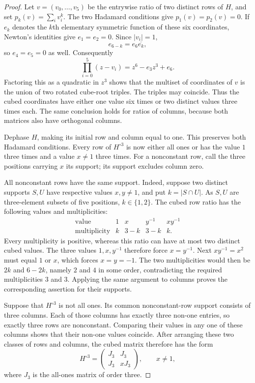 \begin{proof}
Let $v=(v_0,\ldots,v_5)$ be the entrywise ratio of two distinct rows of
$H$, and set $p_k(v)=\sum_i v_i^k$. The two Hadamard conditions give
$p_1(v)=p_2(v)=0$. If $e_k$ denotes the $k$th elementary symmetric
function of these six coordinates, Newton's identities give
$e_1=e_2=0$. Since $|v_i|=1$,
\[
 e_{6-k}=e_6\overline{e_k},
\]
so $e_4=e_5=0$ as well. Consequently
\[
 \prod_{i=0}^5(z-v_i)=z^6-e_3z^3+e_6.
\]
Factoring this as a quadratic in $z^3$ shows that the multiset of
coordinates of $v$ is the union of two rotated cube-root triples.
The triples may coincide. Thus the cubed coordinates have either one
value six times or two distinct values three times each. The same
conclusion holds for ratios of columns, because both matrices also
have orthogonal columns.

Dephase $H$, making its initial row and column equal to one. This
preserves both Hadamard conditions. Every row of $H^{\circ3}$ is now
either all ones or has the value $1$ three times and a value $x\ne1$
three times. For a nonconstant row, call the three positions carrying
$x$ its support; its support excludes column zero.

All nonconstant rows have the same support. Indeed, suppose two
distinct supports $S,U$ have respective values $x,y\ne1$, and put
$k=|S\cap U|$. As $S,U$ are three-element subsets of five positions,
$k\in\{1,2\}$. The cubed row ratio has the following values and
multiplicities:
\[
\begin{array}{c|cccc}
\text{value}&1&x&y^{-1}&xy^{-1}\\
\text{multiplicity}&k&3-k&3-k&k.
\end{array}
\]
Every multiplicity is positive, whereas this ratio can have at most two
distinct cubed values. The three values $1,x,y^{-1}$ therefore force
$x=y^{-1}$. Next $xy^{-1}=x^2$ must equal $1$ or $x$, which forces
$x=y=-1$. The two multiplicities would then be $2k$ and $6-2k$, namely
$2$ and $4$ in some order, contradicting the required multiplicities
$3$ and $3$. Applying the same argument to columns proves the
corresponding assertion for their supports.

Suppose that $H^{\circ3}$ is not all ones. Its common nonconstant-row
support consists of three columns. Each of those columns has exactly
three non-one entries, so exactly three rows are nonconstant. Comparing
their values in any one of these columns shows that their non-one
values coincide. After arranging these two classes of rows and columns,
the cubed matrix therefore has the form
\begin{equation}\label{eq:cubic-block}
 H^{\circ3}=\begin{pmatrix}
 J_3&J_3\\ J_3&xJ_3
 \end{pmatrix},\qquad x\ne1,
\end{equation}
where $J_3$ is the all-ones matrix of order three.


\end{proof}
